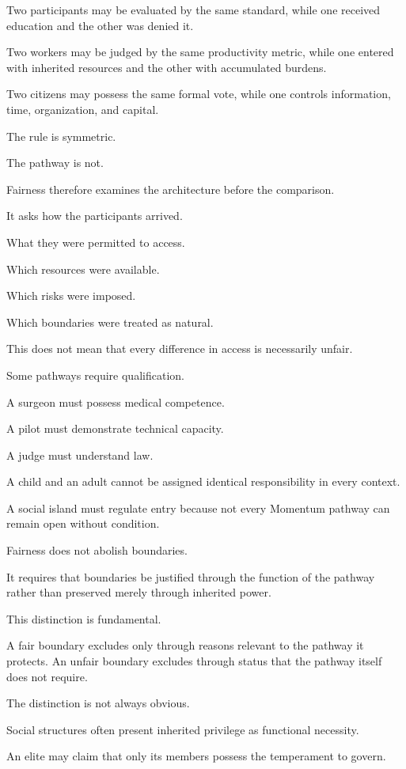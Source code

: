 Two participants may be evaluated by the same standard, while one received education and the other was denied it.

Two workers may be judged by the same productivity metric, while one entered with inherited resources and the other with accumulated burdens.

Two citizens may possess the same formal vote, while one controls information, time, organization, and capital.

The rule is symmetric.

The pathway is not.

Fairness therefore examines the architecture before the comparison.

It asks how the participants arrived.

What they were permitted to access.

Which resources were available.

Which risks were imposed.

Which boundaries were treated as natural.

This does not mean that every difference in access is necessarily unfair.

Some pathways require qualification.

A surgeon must possess medical competence.

A pilot must demonstrate technical capacity.

A judge must understand law.

A child and an adult cannot be assigned identical responsibility in every context.

A social island must regulate entry because not every Momentum pathway can remain open without condition.

Fairness does not abolish boundaries.

It requires that boundaries be justified through the function of the pathway rather than preserved merely through inherited power.

This distinction is fundamental.

A fair boundary excludes only through reasons relevant to the pathway it protects. An unfair boundary excludes through status that the pathway itself does not require.

The distinction is not always obvious.

Social structures often present inherited privilege as functional necessity.

An elite may claim that only its members possess the temperament to govern.

